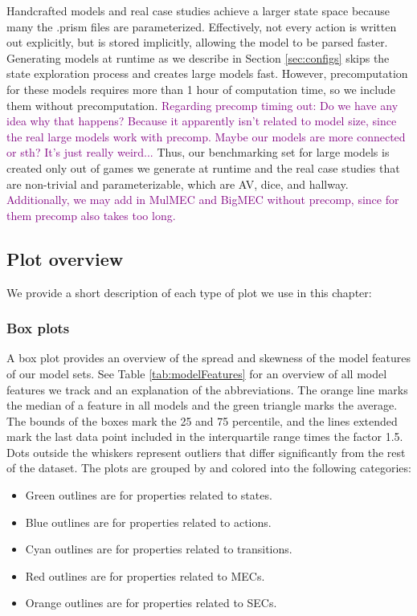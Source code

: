 Handcrafted models and real case studies achieve a larger state space because many the .prism files are parameterized.
Effectively, not every action is written out explicitly, but is stored implicitly, allowing the model to be parsed faster.
Generating models at runtime as we describe in Section \ref{sec:configs} skips the state exploration process and 
creates large models fast. However, precomputation for these models requires more than 1 hour of computation time, so we include them without precomputation. \textcolor{purple}{Regarding precomp timing out: Do we have any idea why that happens? Because it apparently isn't related to model size, since the real large models work with precomp. Maybe our models are more connected or sth? It's just really weird...}
Thus, our benchmarking set for large models is created only out of games we generate at runtime and the real case studies that are non-trivial and parameterizable, 
which are AV, dice, and hallway. \textcolor{purple}{Additionally, we may add in MulMEC and BigMEC without precomp, since for them precomp also takes too long.}

\subsection{Plot overview} \label{subsec:plots}
We provide a short description of each type of plot we use in this chapter:
\subsubsection*{Box plots} \label{plot:boxplot}
A box plot provides an overview of the spread and skewness of the model features of our model sets.
See Table \ref{tab:modelFeatures} for an overview of all model features we track and an explanation of the abbreviations.
The orange line marks the median of a feature in all models and the green triangle marks the
average. The bounds of the boxes mark the 25 and 75 percentile, and the lines extended
mark the last data point included in the interquartile range times the factor 1.5. Dots outside the whiskers represent
outliers that differ significantly from the rest of the dataset.
The plots are grouped by and colored into the following categories:
\begin{itemize}
    \item Green outlines are for properties related to states. 
    \item Blue outlines are for properties related to actions. 
    \item Cyan outlines are for properties related to transitions.
    \item Red outlines are for properties related to MECs.
    \item Orange outlines are for properties related to SECs. 
\end{itemize}

